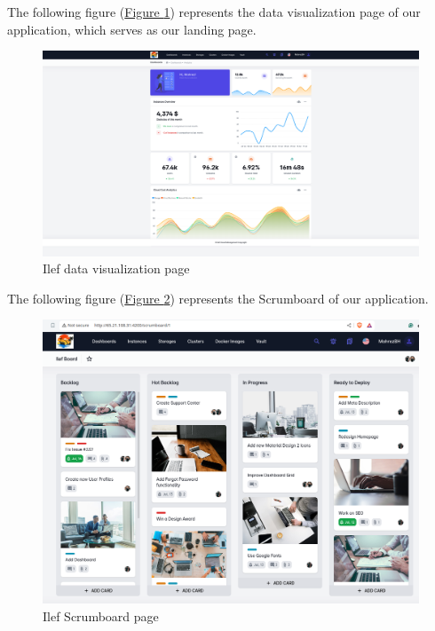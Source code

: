 The following figure (\hyperref[fig:data-visualization]{Figure \ref{fig:data-visualization}}) represents the data visualization page of our application, which serves as our landing page.


\begin{figure}[h]
  \center
  \includegraphics[width=13cm]{./chapters/sprint4/landing page.png}
  \caption{Ilef data visualization page}
  \label{fig:data-visualization}
\end{figure}

The following figure (\hyperref[fig:scrumboard]{Figure \ref{fig:scrumboard}})  represents the Scrumboard of our application.
\begin{figure}[h]
  \center
  \includegraphics[width=13cm]{./chapters/sprint4/scrumboard.png}
  \caption{Ilef Scrumboard page}
  \label{fig:scrumboard}
\end{figure}

